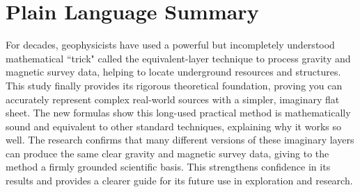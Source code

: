 \documentclass[draft]{agujournal2019}
\begin{document}




\section*{Plain Language Summary}
For decades, geophysicists have used a powerful but incompletely understood mathematical 
``trick" called the equivalent-layer technique to process gravity and magnetic survey data, 
helping to locate underground resources and structures. This study finally provides its 
rigorous theoretical foundation, proving you can accurately represent complex real-world 
sources with a simpler, imaginary flat sheet. 
The new formulas show this long-used practical method is mathematically sound and equivalent 
to other standard techniques, explaining why it works so well. The research confirms that many 
different versions of these imaginary layers can produce the same clear gravity and magnetic 
survey data, giving to the method a firmly grounded scientific basis. This strengthens 
confidence in its results and provides a clearer guide for its future use in exploration and 
research.


%
%

%

\end{document}
